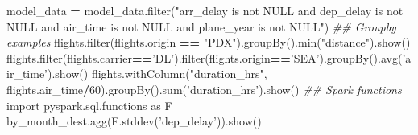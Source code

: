\documentclass[]{book}
\newenvironment{Shaded}{\begin{snugshade}}{\end{snugshade}}
\newcommand{\DecValTok}[1]{\textcolor[rgb]{0.00,0.00,0.81}{#1}}
\newcommand{\StringTok}[1]{\textcolor[rgb]{0.31,0.60,0.02}{#1}}
\newcommand{\ImportTok}[1]{#1}
\newcommand{\CommentTok}[1]{\textcolor[rgb]{0.56,0.35,0.01}{\textit{#1}}}
\newcommand{\OperatorTok}[1]{\textcolor[rgb]{0.81,0.36,0.00}{\textbf{#1}}}
\newcommand{\BuiltInTok}[1]{#1}
\newcommand{\NormalTok}[1]{#1}
\theoremstyle{definition}
\theoremstyle{definition}
\theoremstyle{definition}
\theoremstyle{remark}
\begin{document}
\begin{Shaded}
\begin{Highlighting}[]
\NormalTok{model_data }\OperatorTok{=}\NormalTok{ model_data.}\BuiltInTok{filter}\NormalTok{(}\StringTok{"arr_delay is not NULL and dep_delay is not NULL and air_time is not NULL and plane_year is not NULL"}\NormalTok{)}
\CommentTok{## Groupby examples}
\NormalTok{flights.}\BuiltInTok{filter}\NormalTok{(flights.origin }\OperatorTok{==} \StringTok{"PDX"}\NormalTok{).groupBy().}\BuiltInTok{min}\NormalTok{(}\StringTok{"distance"}\NormalTok{).show()}
\NormalTok{flights.}\BuiltInTok{filter}\NormalTok{(flights.carrier}\OperatorTok{==}\StringTok{'DL'}\NormalTok{).}\BuiltInTok{filter}\NormalTok{(flights.origin}\OperatorTok{==}\StringTok{'SEA'}\NormalTok{).groupBy().avg(}\StringTok{'air_time'}\NormalTok{).show()}
\NormalTok{flights.withColumn(}\StringTok{"duration_hrs"}\NormalTok{, flights.air_time}\OperatorTok{/}\DecValTok{60}\NormalTok{).groupBy().}\BuiltInTok{sum}\NormalTok{(}\StringTok{'duration_hrs'}\NormalTok{).show()}
\CommentTok{## Spark functions}
\ImportTok{import}\NormalTok{ pyspark.sql.functions }\ImportTok{as}\NormalTok{ F}
\NormalTok{by_month_dest.agg(F.stddev(}\StringTok{'dep_delay'}\NormalTok{)).show()}
\end{Highlighting}
\end{Shaded}
\end{document}
